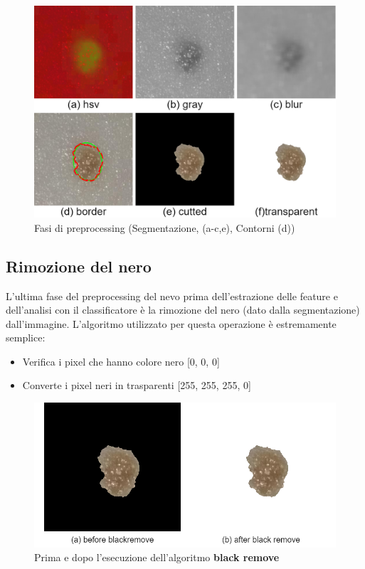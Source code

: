 {\begin{figure}[h]
\begin{center}
		\includegraphics[scale=0.4]{figure/capitolo6/borderlist.png}
	\end{center}
	\caption{Fasi di preprocessing (Segmentazione, (a-c,e), Contorni (d))}	
\end{figure}
\subsection{Rimozione del nero}
L'ultima fase del preprocessing del nevo prima dell'estrazione delle feature e dell'analisi con il classificatore è la rimozione del nero (dato dalla segmentazione) dall'immagine.
L'algoritmo utilizzato per questa operazione è estremamente semplice:
\begin{itemize}
	\item Verifica i pixel che hanno colore nero [0, 0, 0]
	\item Converte i pixel neri in trasparenti [255, 255, 255, 0]
\end{itemize}
	\begin{figure}[h]
	\begin{center}
		\includegraphics[scale=0.5]{figure/capitolo6/blackremove.png}
	\end{center}
	\caption{Prima e dopo l'esecuzione dell'algoritmo \textbf{black remove}}	
\end{figure}
\newpage

}
